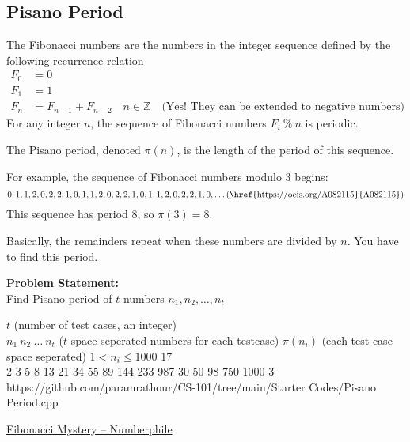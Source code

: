 \subsection{Pisano Period}
The Fibonacci numbers are the numbers in the integer sequence defined by the following recurrence relation
\begin{equation}
	\begin{aligned}
		F_0 &= 0\\
		F_1 &= 1 \\
		F_n &= F_{n-1} + F_{n-2}\quad n \in \mathbb{Z}\quad\text{(Yes! They can be extended to negative numbers)}
	\end{aligned}
\end{equation}
For any integer $n$, the sequence of Fibonacci numbers $F_i \ \%\ n$ is periodic.

The Pisano period, denoted $\pi(n)$, is the length of the period of this sequence.

For example, the sequence of Fibonacci numbers modulo 3 begins:
\begin{equation*}
	0, 1, 1, 2, 0, 2, 2, 1, 0, 1, 1, 2, 0, 2, 2, 1, 0, 1, 1, 2, 0, 2, 2, 1, 0,\ldots\text{(\href{https://oeis.org/A082115}{A082115})}
\end{equation*}
This sequence has period 8, so $\pi(3) = 8$.

Basically, the remainders repeat when these numbers are divided by $n$. You have to find this period.

\textbf{Problem Statement:}\\
Find Pisano period of $t$ numbers $n_1,n_2,\ldots,n_t$
\begin{testcases}
	{$t$ \hfill(number of test cases, an integer)\\
	$n_1\ n_2\ \ldots\ n_t$ \hfill($t$ space seperated numbers for each testcase)}
	{$\pi(n_i)$ \hfill(each test case space seperated)}
	{$1 < n_i \leq 1000$}
	{17\\2 3 5 8 13 21 34 55 89 144 233 987 30 50 98 750 1000}
	{3}
	{https://github.com/paramrathour/CS-101/tree/main/Starter Codes/Pisano Period.cpp}
\end{testcases}
\begin{funvideo}
\href{https://youtu.be/Nu-lW-Ifyec}{Fibonacci Mystery -- Numberphile}
\end{funvideo}